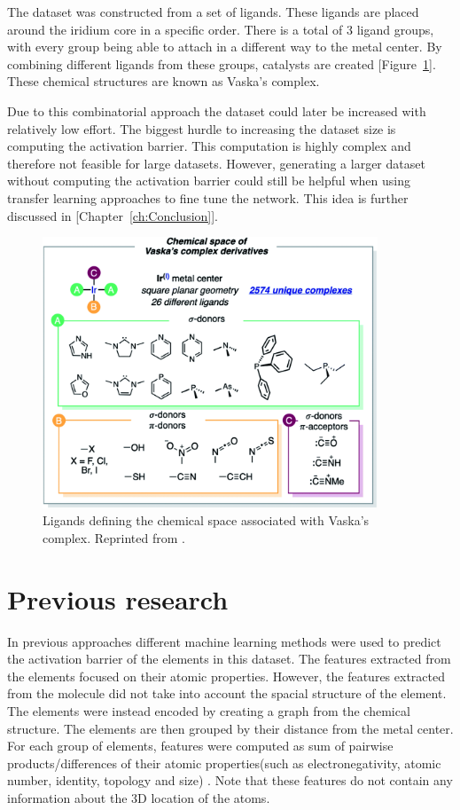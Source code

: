 The dataset was constructed from a set of ligands.
These ligands are placed around the iridium core in a specific order.
There is a total of 3 ligand groups, with every group being able to attach in a different way to the metal center.
By combining different ligands from these groups, catalysts are created [Figure~\ref{fig:chemspace}].
These chemical structures are known as Vaska's complex.

Due to this combinatorial approach the dataset could later be increased with relatively low effort.
The biggest hurdle to increasing the dataset size is computing the activation barrier.
This computation is highly complex and therefore not feasible for large datasets.
However, generating a larger dataset without computing the activation barrier could still be helpful when using transfer learning approaches to fine tune the network.
This idea is further discussed in [Chapter~\ref{ch:Conclusion}].

\begin{figure}
  \centering
  \includegraphics[width=10cm]{figures/introduction/chem-space.png}
  \caption[Vaska's space]{Ligands defining the chemical space associated with Vaska's complex. Reprinted from \cite{friederich_dos}.}
  \label{fig:chemspace}
\end{figure}


\section{Previous research}

In previous approaches different machine learning methods were used to predict the activation barrier of the elements in this dataset.
The features extracted from the elements focused on their atomic properties.
However, the features extracted from the molecule did not take into account the spacial structure of the element.
The elements were instead encoded by creating a graph from the chemical structure.
The elements are then grouped by their distance from the metal center.
For each group of elements, features were computed as sum of pairwise products/differences of their atomic properties(such as electronegativity, atomic number, identity, topology and size) \cite{friederich_dos}.
Note that these features do not contain any information about the 3D location of the atoms.

